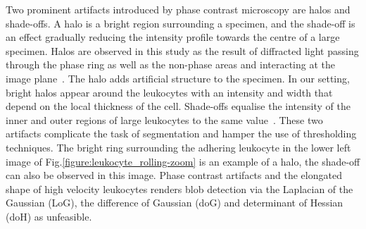 Two prominent artifacts introduced by phase contrast microscopy are halos and shade-offs. A halo is a bright region surrounding a specimen, and the shade-off is an effect gradually reducing the intensity profile towards the centre of a large specimen. Halos are observed in this study as the result of diffracted light passing through the phase ring as well as the non-phase areas and interacting at the image plane~\cite{Yin2012}. The halo adds artificial structure to the specimen. In our setting, bright halos appear around the leukocytes with an intensity and width that depend on the local thickness of the cell. Shade-offs equalise the intensity of the inner and outer regions of large leukocytes to the same value~\cite{Otaki2000}. These two artifacts complicate the task of segmentation and hamper the use of thresholding techniques. The bright ring surrounding the adhering leukocyte in the lower left image of Fig.\ref{figure:leukocyte_rolling-zoom} is an example of a halo, the shade-off can also be observed in this image. Phase contrast artifacts and the elongated shape of high velocity leukocytes renders blob detection via the Laplacian of the Gaussian (LoG), the difference of Gaussian (doG) and determinant of Hessian (doH) as unfeasible.

